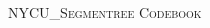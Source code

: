 \documentclass[a4paper,10pt,oneside]{article}
\begin{document}
  \begin{multicols}{3}
  \pagestyle{fancy}

  \fancyfoot{}
  \fancyhead[R]{\thepage}

  \renewcommand{\headrulewidth}{0.4pt}
  \renewcommand{\contentsname}{Contents}


  \scriptsize
  
  \clearpage
  \end{multicols}
  \newpage
  \begin{multicols}{3}
  \enlargethispage*{\baselineskip}
  \begin{center}
    \Huge\textsc{NYCU\_Segmentree Codebook}
    \vspace{0.35cm}
  \end{center}
  \tableofcontents
  \end{multicols}
  \clearpage
\end{document}
